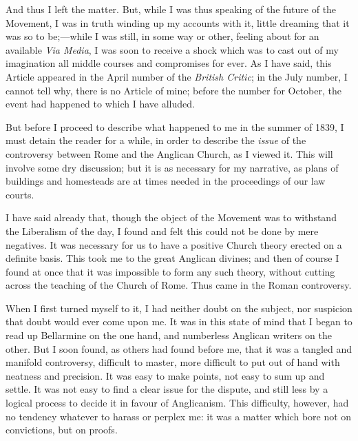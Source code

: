 And thus I left the matter. But, while I was thus speaking of the
future of the Movement, I was in truth winding up my accounts with it,
little dreaming that it was so to be;—while I was still, in some way or
other, feeling about for an available \emph{Via Media}, I was soon to
receive a shock which was to cast out of my imagination all middle
courses and compromises for ever. As I have said, this Article appeared
in the April number of the \emph{British Critic}; in the July number, I cannot
tell why, there is no Article of mine; before the number for October,
the event had happened to which I have alluded.

But before I proceed to describe what happened to me in the summer of
1839, I must detain the reader for a while, in order to describe the \emph{issue} of the controversy between Rome and the Anglican Church, as I
viewed it. This will involve some dry discussion; but it is as necessary
for my narrative, as plans of buildings and homesteads are at times
needed in the proceedings of our law courts.

I have said already that, though the object of the Movement was to
withstand the Liberalism of the day, I found and felt this could not be
done by mere negatives. It was necessary for us to have a positive
Church theory erected on a definite basis. This took me to the great
Anglican divines; and then of course I found at once that it was
impossible to form any such theory, without cutting across the teaching
of the Church of Rome. Thus came in the Roman controversy.

When I first turned myself to it, I had neither doubt on the subject,
nor suspicion that doubt would ever come upon me. It was in this state
of mind that I began to read up Bellarmine on the one hand, and
numberless Anglican writers on the other. But I soon found, as others
had found before me, that it was a tangled and manifold controversy,
difficult to master, more difficult to put out of hand with neatness and
precision. It was easy to make points, not easy to sum up and settle. It
was not easy to find a clear issue for the dispute, and still less by a
logical process to decide it in favour of Anglicanism. This difficulty,
however, had no tendency whatever to harass or perplex me: it was a
matter which bore not on convictions, but on proofs.

